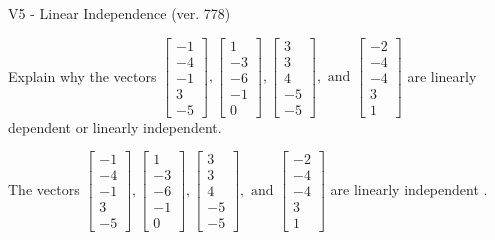 \begin{exercise}
  \begin{exerciseTitle}V5 - Linear Independence (ver. 778)\end{exerciseTitle}
  \begin{exerciseStatement}
    Explain why the vectors \(\left[\begin{array}{r}
-1 \\
-4 \\
-1 \\
3 \\
-5
\end{array}\right] , \left[\begin{array}{r}
1 \\
-3 \\
-6 \\
-1 \\
0
\end{array}\right] , \left[\begin{array}{r}
3 \\
3 \\
4 \\
-5 \\
-5
\end{array}\right] , \text{ and } \left[\begin{array}{r}
-2 \\
-4 \\
-4 \\
3 \\
1
\end{array}\right]\) are linearly dependent or linearly independent.	


  \end{exerciseStatement}
  \begin{exerciseAnswer}
   The vectors \(\left[\begin{array}{r}
-1 \\
-4 \\
-1 \\
3 \\
-5
\end{array}\right] , \left[\begin{array}{r}
1 \\
-3 \\
-6 \\
-1 \\
0
\end{array}\right] , \left[\begin{array}{r}
3 \\
3 \\
4 \\
-5 \\
-5
\end{array}\right] , \text{ and } \left[\begin{array}{r}
-2 \\
-4 \\
-4 \\
3 \\
1
\end{array}\right]\) are 
  	 linearly independent  .
  


  \end{exerciseAnswer}
\end{exercise}